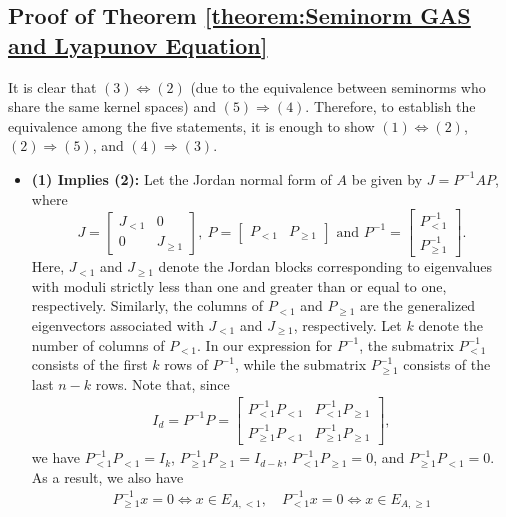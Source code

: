 \documentclass[11 pt]{article}
\begin{document}
	\subsection{Proof of Theorem \ref{theorem:Seminorm GAS and Lyapunov Equation}}
	\label{pf:theorem:Seminorm GAS and Lyapunov Equation}
	It is clear that $(3)\Leftrightarrow (2)$ (due to the equivalence between seminorms who share the same kernel spaces) and $(5) \Rightarrow (4)$. Therefore, to establish the equivalence among the five statements, it is enough to show $(1)\Leftrightarrow (2)$, $(2) \Rightarrow (5)$, and $(4)\Rightarrow (3)$.
	
	\begin{itemize}
		\item \textbf{(1) Implies (2):} Let the Jordan normal form of $A$ be given by $J = P^{-1} A P$, where
		\begin{equation}\label{eq:test}
			J=\begin{bmatrix}
				J_{<1} & 0\\
				0 & J_{\geq 1} 
			\end{bmatrix},~ P=\begin{bmatrix}
				P_{<1} & P_{\geq 1} 
			\end{bmatrix} \text{ and } P^{-1}=\begin{bmatrix}
				P^{-1}_{<1} \\
				P^{-1}_{\geq 1}
			\end{bmatrix}.
		\end{equation}
		Here, $ J_{<1} $ and $ J_{\geq 1} $ denote the Jordan blocks corresponding to eigenvalues with moduli strictly less than one and greater than or equal to one, respectively. Similarly, the columns of $ P_{<1} $ and $ P_{\geq 1} $ are the generalized eigenvectors associated with $ J_{<1} $ and $ J_{\geq 1} $, respectively. Let $ k $ denote the number of columns of $ P_{<1} $. In our expression for $ P^{-1} $, the submatrix $ P_{<1}^{-1} $ consists of the first $ k $ rows of $ P^{-1} $, while the submatrix $ P_{\geq 1}^{-1} $ consists of the last $ n-k $ rows.
		Note that, since
		\begin{align}\label{eq:gen_eig_prop}
			I_d=P^{-1}P=\begin{bmatrix}
				P^{-1}_{<1} P_{<1} & P^{-1}_{<1}P_{\geq 1}\\
				P^{-1}_{\geq 1} P_{<1}  & P^{-1}_{\geq 1} P_{\geq 1}
			\end{bmatrix},
		\end{align}
		we have $P^{-1}_{<1} P_{<1}=I_k$, $P^{-1}_{\geq 1} P_{\geq 1}=I_{d-k}$, $P^{-1}_{<1}P_{\geq 1}=0$, and $P^{-1}_{\geq 1} P_{<1}=0$. 
		As a result, we also have
		\begin{align}\label{eq:Px=0}
			P_{\geq 1}^{-1}x=0 \Leftrightarrow  x\in E_{A,<1},\quad P_{< 1}^{-1}x=0 \Leftrightarrow  x\in E_{A,\geq 1}
		\end{align}
		

\end{itemize}
\end{document}
